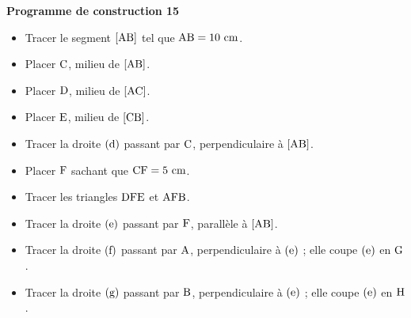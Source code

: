 \documentclass[exercice,a4]{thedocument}%
\begin{document}
%
\noindent\textbf{Programme de construction 15}\par\smallskip\noindent
\begin{itemize}
    \item Tracer le segment $[\text{AB}]$ tel que
    $\text{AB}=10\text{ cm}$.
    \item Placer $\text{C}$, milieu de $[\text{AB}]$.
    \item Placer $\text{D}$, milieu de $[\text{AC}]$.
    \item Placer $\text{E}$, milieu de $[\text{CB}]$.
    \item Tracer la droite $(\text{d})$ passant par
    $\text{C}$, perpendiculaire à $[\text{AB}]$.
    \item Placer $\text{F}$ sachant que $\text{CF}=5\text{ cm}$.
    \item Tracer les triangles $\text{DFE}$ et $\text{AFB}$.
    \item Tracer la droite $(\text{e})$ passant par
    $\text{F}$, parallèle à $[\text{AB}]$.
    \item Tracer la droite $(\text{f})$ passant par
    $\text{A}$, perpendiculaire à $(\text{e})$ ; elle coupe
    $(\text{e})$ en $\text{G}$.
    \item Tracer la droite $(\text{g})$ passant par
    $\text{B}$, perpendiculaire à $(\text{e})$ ; elle coupe
    $(\text{e})$ en $\text{H}$.
\end{itemize}
\end{document}
